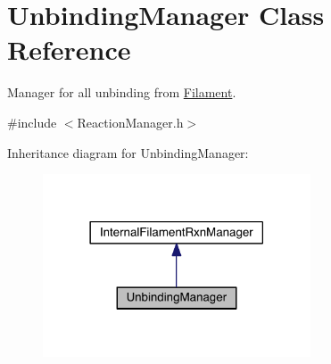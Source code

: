 \hypertarget{classUnbindingManager}{\section{Unbinding\+Manager Class Reference}
\label{classUnbindingManager}
}


Manager for all unbinding from \hyperlink{classFilament}{Filament}.  




{\ttfamily \#include $<$Reaction\+Manager.\+h$>$}



Inheritance diagram for Unbinding\+Manager\+:\nopagebreak
\begin{figure}[H]
\begin{center}
\leavevmode
\includegraphics[width=225pt]{classUnbindingManager__inherit__graph}
\end{center}
\end{figure}


